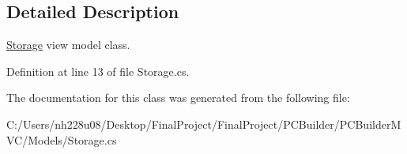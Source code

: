 \subsection{Detailed Description}
\hyperlink{class_p_c_builder_m_v_c_1_1_models_1_1_storage}{Storage} view model class. 



Definition at line 13 of file Storage.\+cs.



The documentation for this class was generated from the following file\+:\begin{DoxyCompactItemize}
\item 
C\+:/\+Users/nh228u08/\+Desktop/\+Final\+Project/\+Final\+Project/\+P\+C\+Builder/\+P\+C\+Builder\+M\+V\+C/\+Models/Storage.\+cs\end{DoxyCompactItemize}
